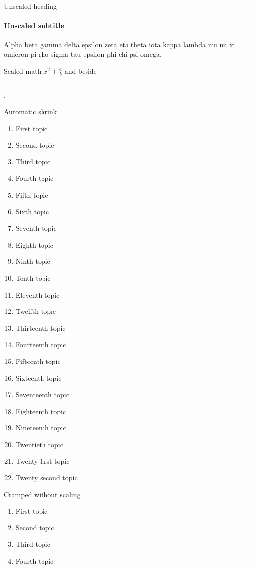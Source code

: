 \documentclass{beamer}
\begin{document}
\begin{frame}[shrink=20]{Unscaled heading}
\framesubtitle{Unscaled subtitle}
Alpha beta gamma delta epsilon zeta eta theta iota kappa lambda mu nu xi omicron pi rho sigma tau upsilon phi chi psi omega.
\par
Scaled math $x^2+\frac{a}{b}$ and  beside \rule{12pt}{2pt}.
\end{frame}

\begin{frame}[shrink]{Automatic shrink}
\begin{enumerate}
\item First topic
\item Second topic
\item Third topic
\item Fourth topic
\item Fifth topic
\item Sixth topic
\item Seventh topic
\item Eighth topic
\item Ninth topic
\item Tenth topic
\item Eleventh topic
\item Twelfth topic
\item Thirteenth topic
\item Fourteenth topic
\item Fifteenth topic
\item Sixteenth topic
\item Seventeenth topic
\item Eighteenth topic
\item Nineteenth topic
\item Twentieth topic
\item Twenty first topic
\item Twenty second topic
\end{enumerate}
\end{frame}

\begin{frame}[squeeze]{Cramped without scaling}
\begin{enumerate}
\item First topic
\item Second topic
\item Third topic
\item Fourth topic
\end{enumerate}
\end{frame}
\end{document}
